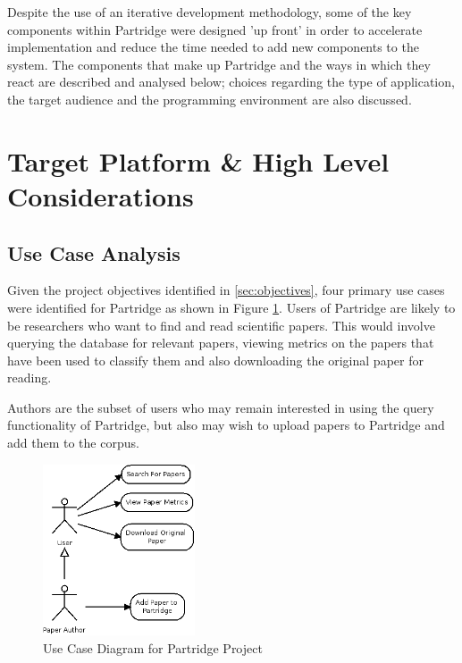 %
%

Despite the use of an iterative development methodology, some of the key
components within Partridge were designed 'up front' in order to accelerate
implementation and reduce the time needed to add new components to the
system. The components that make up Partridge and the ways in which they react
are described and analysed below; choices regarding the type of application,
the target audience and the programming environment are also discussed.


\section{ Target Platform \& High Level Considerations }

\subsection{Use Case Analysis}

Given the project objectives identified in \ref{sec:objectives}, four primary
use cases were identified for Partridge as shown in Figure \ref{fig:use_cases}.
Users of Partridge are likely to be researchers who want to find and read
scientific papers. This would involve querying the database for relevant
papers, viewing metrics on the papers that have been used to classify them and
also downloading the original paper for reading. 

Authors are the subset of users who may remain interested in using the query
functionality of Partridge, but also may wish to upload papers to Partridge and
add them to the corpus.

\begin{figure}[!h]
\centering
\includegraphics[width=0.4\textwidth]{images/design/use_cases.png}
\caption{Use Case Diagram for Partridge Project}
\label{fig:use_cases}
\end{figure}

